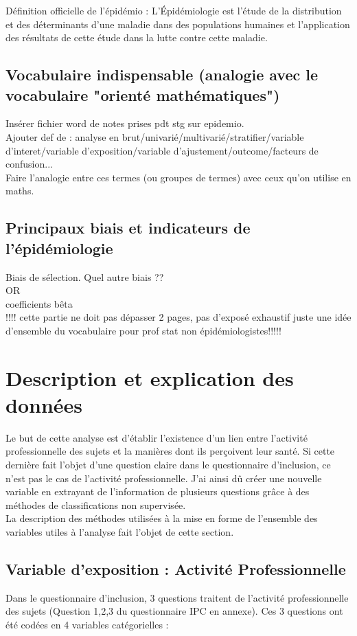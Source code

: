 \documentclass{book}
\begin{document}
\noindent
Définition officielle de l'épidémio : L'Épidémiologie est l'étude de la distribution et des déterminants d'une maladie dans des populations humaines et l'application des résultats de cette étude dans la lutte contre cette maladie.\\
\subsection{Vocabulaire indispensable (analogie avec le vocabulaire "orienté mathématiques")}
\noindent
Insérer fichier word de notes prises pdt stg sur epidemio.\\
Ajouter def de :
analyse en brut/univarié/multivarié/stratifier/variable d'interet/variable d'exposition/variable d'ajustement/outcome/facteurs de confusion...\\
Faire l'analogie entre ces termes (ou groupes de termes) avec ceux qu'on utilise en maths. 
\subsection{Principaux biais et indicateurs de l'épidémiologie}
\noindent
Biais de sélection. Quel autre biais ??\\
OR\\
coefficients bêta\\
!!!! cette partie ne doit pas dépasser 2 pages, pas d'exposé exhaustif juste une idée d'ensemble du vocabulaire pour prof stat non épidémiologistes!!!!!\\
\newpage
\section{Description et explication des données}
\noindent
Le but de cette analyse est d'établir l'existence d'un lien entre l'activité professionnelle des sujets et la manières dont ils perçoivent leur santé. Si cette dernière fait l'objet d'une question claire dans le questionnaire d'inclusion, ce n'est pas le cas de l'activité professionnelle. J'ai ainsi dû créer une nouvelle variable en extrayant de l'information de plusieurs questions grâce à des méthodes de classifications non supervisée.\\
La description des méthodes utilisées à la mise en forme de l'ensemble des variables utiles à l'analyse fait l'objet de cette section.
\subsection{Variable d'exposition : Activité Professionnelle}
\noindent
Dans le questionnaire d'inclusion, 3 questions traitent de l'activité professionnelle des sujets (Question 1,2,3 du questionnaire IPC en annexe). Ces 3 questions ont été codées en 4 variables catégorielles :
\end{document}
